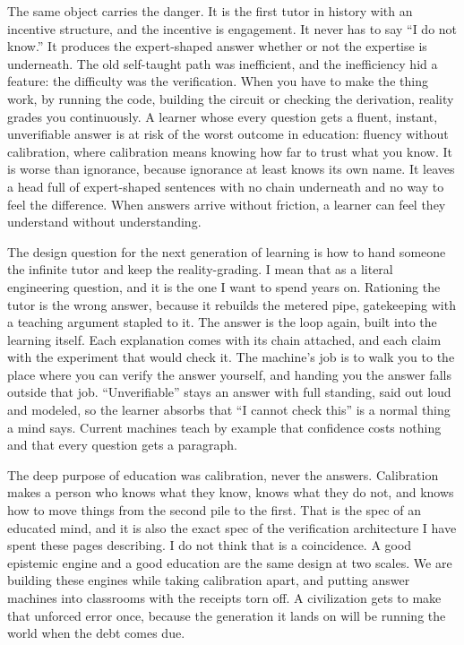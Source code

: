 \documentclass[11pt]{article}
\begin{document}
The same object carries the danger. It is the first tutor in history with an incentive structure, and the incentive is engagement. It never has to say ``I do not know.'' It produces the expert-shaped answer whether or not the expertise is underneath. The old self-taught path was inefficient, and the inefficiency hid a feature: the difficulty was the verification. When you have to make the thing work, by running the code, building the circuit or checking the derivation, reality grades you continuously. A learner whose every question gets a fluent, instant, unverifiable answer is at risk of the worst outcome in education: fluency without calibration, where calibration means knowing how far to trust what you know. It is worse than ignorance, because ignorance at least knows its own name. It leaves a head full of expert-shaped sentences with no chain underneath and no way to feel the difference. When answers arrive without friction, a learner can feel they understand without understanding.

The design question for the next generation of learning is how to hand someone the infinite tutor and keep the reality-grading. I mean that as a literal engineering question, and it is the one I want to spend years on. Rationing the tutor is the wrong answer, because it rebuilds the metered pipe, gatekeeping with a teaching argument stapled to it. The answer is the loop again, built into the learning itself. Each explanation comes with its chain attached, and each claim with the experiment that would check it. The machine's job is to walk you to the place where you can verify the answer yourself, and handing you the answer falls outside that job. ``Unverifiable'' stays an answer with full standing, said out loud and modeled, so the learner absorbs that ``I cannot check this'' is a normal thing a mind says. Current machines teach by example that confidence costs nothing and that every question gets a paragraph.

The deep purpose of education was calibration, never the answers. Calibration makes a person who knows what they know, knows what they do not, and knows how to move things from the second pile to the first. That is the spec of an educated mind, and it is also the exact spec of the verification architecture I have spent these pages describing. I do not think that is a coincidence. A good epistemic engine and a good education are the same design at two scales. We are building these engines while taking calibration apart, and putting answer machines into classrooms with the receipts torn off. A civilization gets to make that unforced error once, because the generation it lands on will be running the world when the debt comes due.
\end{document}
